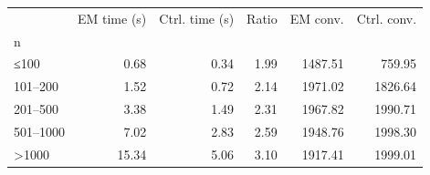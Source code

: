 \begin{tabular}{lrrrrr}
\toprule
 & EM time (s) & Ctrl. time (s) & Ratio & EM conv. & Ctrl. conv. \\
n &  &  &  &  &  \\
\midrule
≤100 & 0.68 & 0.34 & 1.99 & 1487.51 & 759.95 \\
101–200 & 1.52 & 0.72 & 2.14 & 1971.02 & 1826.64 \\
201–500 & 3.38 & 1.49 & 2.31 & 1967.82 & 1990.71 \\
501–1000 & 7.02 & 2.83 & 2.59 & 1948.76 & 1998.30 \\
>1000 & 15.34 & 5.06 & 3.10 & 1917.41 & 1999.01 \\
\bottomrule
\end{tabular}
